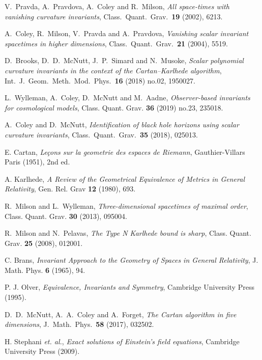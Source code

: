 \documentclass[twocolumn,prd,aps,showpacs,showkeys,amsmath,amssymb]{revtex4-1}
\begin{document}
\begin{thebibliography}{99}


  V.~Pravda, A.~Pravdova, A.~Coley and R.~Milson, \textit{All space-times with vanishing curvature invariants}, Class.\ Quant.\ Grav.\  {\bf 19} (2002), 6213.

 A.~Coley, R.~Milson, V.~Pravda and A.~Pravdova, \textit{Vanishing scalar invariant spacetimes in higher dimensions}, Class.\ Quant.\ Grav.\  {\bf 21} (2004), 5519.

 D.~Brooks, D.~D.~McNutt, J.~P.~Simard and N.~Musoke, \textit{Scalar polynomial curvature invariants in the context of the Cartan–Karlhede algorithm},  Int.\ J.\ Geom.\ Meth.\ Mod.\ Phys.\  {\bf 16} (2018) no.02,  1950027.

 L.~Wylleman, A.~Coley, D.~McNutt and M.~Aadne, \textit{Observer-based invariants for cosmological models}, Class. Quant. Grav. \textbf{36} (2019) no.23, 235018.

 A.~Coley and D.~McNutt, \textit{Identification of black hole horizons using scalar curvature invariants}, Class.\ Quant.\ Grav.\  {\bf 35} (2018),  025013.

    E. Cartan, \textit{Le\c{c}ons sur la geometrie des espaces de Riemann}, Gauthier-Villars Paris (1951), 2nd ed.

 A. Karlhede, \textit{A  Review  of the  Geometrical  Equivalence  of Metrics  in  General Relativity}, Gen. Rel. Grav \textbf{12} (1980), 693.


 R.~Milson and L.~Wylleman, \textit{Three-dimensional spacetimes of maximal order}, Class. Quant. Grav. \textbf{30} (2013), 095004.


 R.~Milson and N.~Pelavas, \textit{The Type N Karlhede bound is sharp}, Class. Quant. Grav. \textbf{25} (2008), 012001.



 C. Brans, \textit{Invariant Approach to the Geometry of Spaces in General Relativity}, J. Math. Phys. \textbf{6} (1965), 94.

 P. J. Olver, \textit{Equivalence, Invariants and Symmetry}, Cambridge University Press (1995).

 D.~D.~McNutt, A.~A.~Coley and A.~Forget, \textit{The Cartan algorithm in five dimensions}, J.\ Math.\ Phys.\  {\bf 58} (2017),  032502.

 H. Stephani \textit{et. al.}, \textit{Exact solutions of Einstein's field equations}, Cambridge University Press (2009).


\end{thebibliography}
\end{document}
